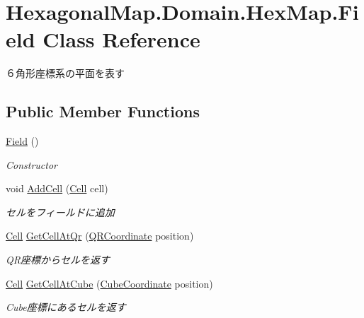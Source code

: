 \hypertarget{class_hexagonal_map_1_1_domain_1_1_hex_map_1_1_field}{}\section{Hexagonal\+Map.\+Domain.\+Hex\+Map.\+Field Class Reference}
\label{class_hexagonal_map_1_1_domain_1_1_hex_map_1_1_field}


６角形座標系の平面を表す  


\subsection*{Public Member Functions}
\begin{DoxyCompactItemize}
\item 
\mbox{\hyperlink{class_hexagonal_map_1_1_domain_1_1_hex_map_1_1_field_ac69714e5b08a8cdddf5d3a2f3aa27b71}{Field}} ()
\begin{DoxyCompactList}\small\item\em Constructor \end{DoxyCompactList}\item 
void \mbox{\hyperlink{class_hexagonal_map_1_1_domain_1_1_hex_map_1_1_field_a44411966c3af9d263987fadf9e122ecc}{Add\+Cell}} (\mbox{\hyperlink{class_hexagonal_map_1_1_domain_1_1_hex_map_1_1_cell}{Cell}} cell)
\begin{DoxyCompactList}\small\item\em セルをフィールドに追加 \end{DoxyCompactList}\item 
\mbox{\hyperlink{class_hexagonal_map_1_1_domain_1_1_hex_map_1_1_cell}{Cell}} \mbox{\hyperlink{class_hexagonal_map_1_1_domain_1_1_hex_map_1_1_field_a248d338a799eb94c36578389951f5040}{Get\+Cell\+At\+Qr}} (\mbox{\hyperlink{struct_hexagonal_map_1_1_domain_1_1_hex_map_1_1_q_r_coordinate}{Q\+R\+Coordinate}} position)
\begin{DoxyCompactList}\small\item\em Q\+R座標からセルを返す \end{DoxyCompactList}\item 
\mbox{\hyperlink{class_hexagonal_map_1_1_domain_1_1_hex_map_1_1_cell}{Cell}} \mbox{\hyperlink{class_hexagonal_map_1_1_domain_1_1_hex_map_1_1_field_a4d45ab6ad7da637fcbca918caa5636a7}{Get\+Cell\+At\+Cube}} (\mbox{\hyperlink{struct_hexagonal_map_1_1_domain_1_1_hex_map_1_1_cube_coordinate}{Cube\+Coordinate}} position)
\begin{DoxyCompactList}\small\item\em Cube座標にあるセルを返す \end{DoxyCompactList}\item 

\end{DoxyCompactItemize}
